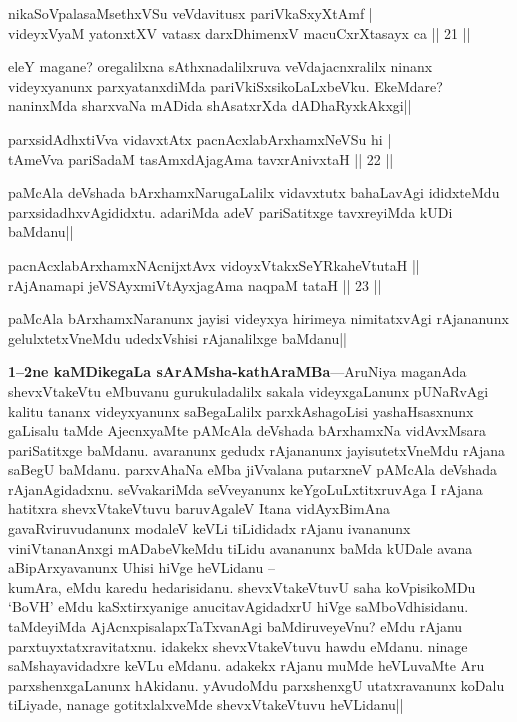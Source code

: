 \begin{shl}
nikaSoVpalasaMsethxVSu veVdavitusx pariVkaSxyXtAmf | \\
videyxVyaM yatonxtXV vatasx darxDhimenxV macuCxrXtasayx ca \hfill|| 21 || 
\end{shl}

\begin{artha}
eleY magane? oregalilxna sAthxnadalilxruva veVdajacnxralilx ninanx 
videyxyanunx parxyatanxdiMda pariVkiSxsikoLaLxbeVku. EkeMdare? 
naninxMda sharxvaNa mADida shAsatxrXda dADhaRyxkAkxgi||
\end{artha}


\begin{shl}
parxsidAdhx\s tiVva vidavxtAtx pacnAcxlabArxhamxNeVSu hi | \\
tAmeVva pariSadaM tasAmxdAjagAma tavxrAnivxtaH \hfill|| 22 || 
\end{shl}

\begin{artha}
paMcAla deVshada bArxhamxNarugaLalilx vidavxtutx bahaLavAgi ididxteMdu 
parxsidadhxvAgididxtu. adariMda adeV pariSatitxge tavxreyiMda kUDi 
baMdanu||
\end{artha}


\begin{shl}
pacnAcxlabArxhamxNAcnijxtAvx vidoyxVtakxSeYRkaheVtutaH || \\
rAjAnamapi jeVSAyxmiVtAyxjagAma naqpaM tataH \hfill|| 23 || 
\end{shl}

\begin{artha}
paMcAla bArxhamxNaranunx jayisi videyxya hirimeya nimitatxvAgi 
rAjananunx gelulxtetxVneMdu udedxVshisi rAjanalilxge baMdanu||
\end{artha}

\textbf{1--2ne kaMDikegaLa sArAMsha-kathAraMBa}---AruNiya maganAda 
shevxVtakeVtu eMbuvanu gurukuladalilx sakala videyxgaLanunx pUNaRvAgi 
kalitu tananx videyxyanunx saBegaLalilx parxkAshagoLisi yashaHsasxnunx 
gaLisalu taMde AjecnxyaMte pAMcAla deVshada bArxhamxNa vidAvxMsara 
pariSatitxge baMdanu. avaranunx gedudx rAjananunx jayisutetxVneMdu 
rAjana saBegU baMdanu. parxvAhaNa eMba jiVvalana putarxneV pAMcAla 
deVshada rAjanAgidadxnu. seVvakariMda seVveyanunx keYgoLuLxtitxruvAga 
I rAjana hatitxra shevxVtakeVtuvu baruvAgaleV Itana vidAyxBimAna 
gavaRviruvudanunx modaleV keVLi tiLididadx rAjanu ivananunx 
viniVtananAnxgi mADabeVkeMdu tiLidu avananunx baMda kUDale avana 
aBipArxyavanunx Uhisi hiVge heVLidanu --\\
kumAra, eMdu karedu hedarisidanu. shevxVtakeVtuvU saha koVpisikoMDu 
`BoVH' eMdu kaSxtirxyanige anucitavAgidadxrU hiVge saMboVdhisidanu. 
taMdeyiMda AjAcnxpisalapxTaTxvanAgi baMdiruveyeVnu? eMdu rAjanu 
parxtuyxtatxravitatxnu. idakekx shevxVtakeVtuvu hawdu eMdanu. ninage 
saMshayavidadxre keVLu eMdanu. adakekx rAjanu muMde heVLuvaMte Aru 
parxshenxgaLanunx hAkidanu. yAvudoMdu parxshenxgU utatxravanunx koDalu 
tiLiyade, nanage gotitxlalxveMde shevxVtakeVtuvu heVLidanu||

